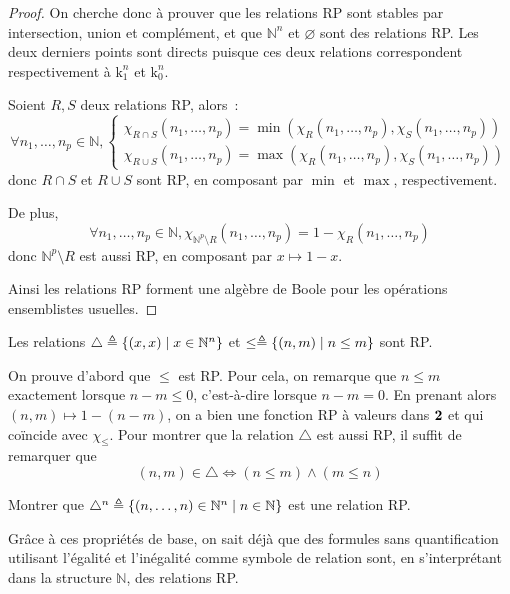 \begin{proof}
  On cherche donc à prouver que les relations RP sont stables par intersection,
  union et complément, et que $\mathbb N^n$ et $\varnothing$ sont des relations
  RP. Les deux derniers points sont directs puisque ces deux relations
  correspondent respectivement à $\mathrm k_1^n$ et $\mathrm k_0^n$.

  Soient $R,S$ deux relations RP, alors~:
  \[\forall n_1,\ldots,n_p \in \mathbb N,
  \begin{cases}
    \chi_{R\cap S}(n_1,\ldots,n_p) =
    \min(\chi_R(n_1,\ldots,n_p),\chi_S(n_1,\ldots,n_p))\\
    \chi_{R\cup S}(n_1,\ldots,n_p) =
    \max(\chi_R(n_1,\ldots,n_p),\chi_S(n_1,\ldots,n_p))
  \end{cases}
  \]
  donc $R\cap S$ et $R\cup S$ sont RP, en composant par $\min$ et $\max$,
  respectivement.

  De plus,
  \[\forall n_1,\ldots,n_p \in \mathbb N,
  \chi_{\mathbb N^p\setminus R}(n_1,\ldots,n_p) = 1 - \chi_R(n_1,\ldots,n_p)\]
  donc $\mathbb N^p \setminus R$ est aussi RP, en composant par
  $x \mapsto 1 - x$.

  Ainsi les relations RP forment une algèbre de Boole pour les opérations
  ensemblistes usuelles.
\end{proof}

\begin{proposition}
  Les relations $\triangle \triangleq \{(x,x) \mid x \in \mathbb N^n\}$ et
  $\leq \triangleq \{(n,m) \mid n \leq m\}$ sont RP.
\end{proposition}

\begin{proposition}
  On prouve d'abord que $\leq$ est RP. Pour cela, on remarque que $n \leq m$
  exactement lorsque $n - m \leq 0$, c'est-à-dire lorsque $n - m = 0$.
  En prenant alors $(n,m) \mapsto 1 - (n - m)$, on a bien une fonction RP à
  valeurs dans $\boldsymbol{2}$ et qui coïncide avec $\chi_\leq$. Pour montrer que
  la relation $\triangle$ est aussi RP, il suffit de remarquer que
  \[(n,m) \in \triangle \iff (n \leq m) \land (m \leq n)\]
\end{proposition}

\begin{exercise}
  Montrer que $\triangle^n \triangleq
  \{(n,\ldots,n) \in \mathbb N^n\mid n \in \mathbb N\}$ est
  une relation RP.
\end{exercise}

Grâce à ces propriétés de base, on sait déjà que des formules sans
quantification utilisant l'égalité et l'inégalité comme symbole de relation
sont, en s'interprétant dans la structure $\mathbb N$, des relations RP.

